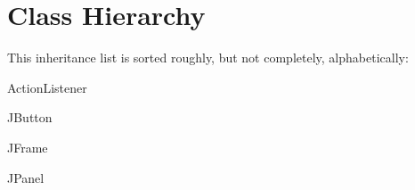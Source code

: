 \section{Class Hierarchy}
This inheritance list is sorted roughly, but not completely, alphabetically\+:\begin{DoxyCompactList}
\item Action\+Listener\begin{DoxyCompactList}
\item {}
\end{DoxyCompactList}
\item J\+Button\begin{DoxyCompactList}
\item {}
\end{DoxyCompactList}
\item J\+Frame\begin{DoxyCompactList}
\item {}
\end{DoxyCompactList}
\item J\+Panel\begin{DoxyCompactList}
\item {}
\end{DoxyCompactList}
\end{DoxyCompactList}
